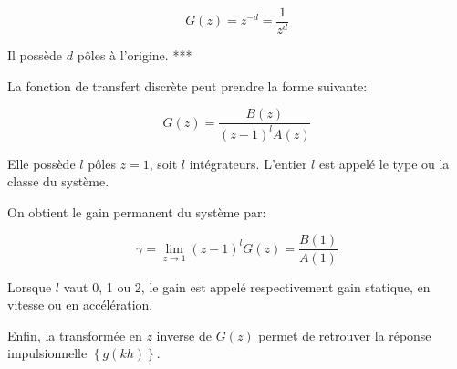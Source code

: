 \documentclass[11pt]{article}
\begin{document}
\[ G(z) = z^{-d} = \frac{1}{z^d} \]

Il possède \(d\) pôles à l'origine. ***

    La fonction de transfert discrète peut prendre la forme suivante:

\[ G(z) = \frac{B(z)}{(z-1)^l A(z)} \]

Elle possède \(l\) pôles \(z=1\), soit \(l\) intégrateurs. L'entier
\(l\) est appelé le type ou la classe du système.

    On obtient le gain permanent du système par:

\[ \gamma = \lim_{z \rightarrow 1} (z-1)^l G(z) = \frac{B(1)}{A(1)} \]

Lorsque \(l\) vaut 0, 1 ou 2, le gain est appelé respectivement gain
statique, en vitesse ou en accélération.

    Enfin, la transformée en \(z\) inverse de \(G(z)\) permet de retrouver
la réponse impulsionnelle \(\left\{g(kh)\right\}\).


    
    
    
\end{document}
